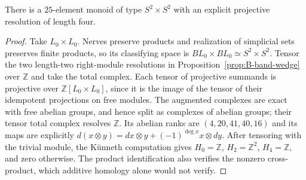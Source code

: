 





\begin{proposition}\label{prop:B-product-model}
There is a $25$-element monoid of type $S^2\times S^2$ with an
explicit projective resolution of length four.
\end{proposition}
\begin{proof}
Take $L_0\times L_0$.  Nerves preserve products and realization of
simplicial sets preserves finite products, so its classifying space is
$BL_0\times BL_0\simeq S^2\times S^2$.
Tensor the two length-two right-module resolutions in
Proposition~\ref{prop:B-band-wedge} over $\mathbb Z$ and take the
total complex.  Each tensor of projective summands is projective over
$\mathbb Z[L_0\times L_0]$, since it is the image of the tensor
of their idempotent projections on free modules.  The augmented
complexes are exact with free abelian groups, and hence split as
complexes of abelian groups; their tensor total complex resolves
$\mathbb Z$.  Its abelian ranks are
$(4,20,41,40,16)$ and its maps are explicitly
$d(x\otimes y)=dx\otimes y+(-1)^{\deg x}x\otimes dy$.
After tensoring with the trivial module, the K\"unneth computation
gives $H_0=\mathbb Z$, $H_2=\mathbb Z^2$, $H_4=\mathbb Z$,
and zero otherwise.  The product identification also verifies the
nonzero cross-product, which additive homology alone would not verify.
\end{proof}

